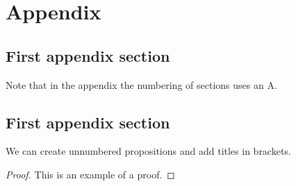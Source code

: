 \chapter*{Appendix}\label{ch:appendix}
\renewcommand{\thesection}{A.\arabic{section}}


\section{First appendix section}

Note that in the appendix the numbering of sections uses an A.



\section{First appendix section}

\begin{proposition*}
    We can create unnumbered propositions and add titles in brackets.
\end{proposition*}

\begin{proof}
    This is an example of a proof.
\end{proof}